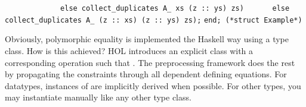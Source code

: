 \begin{isabellebody}
\begin{isamarkuptext}
\verb|             else collect_duplicates A_ xs (z :: ys) zs)|\newline%
\verb|      else collect_duplicates A_ (z :: xs) (z :: ys) zs);|\newline%
\newline%
\verb|end; (*struct Example*)|%
\end{isamarkuptext}%
\isamarkuptrue%
%
\endisatagquote
{\isafoldquote}%
%
\isadelimquote
%
\endisadelimquote
%
\begin{isamarkuptext}%
\noindent Obviously, polymorphic equality is implemented the Haskell
  way using a type class.  How is this achieved?  HOL introduces
  an explicit class  with a corresponding operation
   such that .
  The preprocessing framework does the rest by propagating the
   constraints through all dependent defining equations.
  For datatypes, instances of  are implicitly derived
  when possible.  For other types, you may instantiate 
  manually like any other type class.


\end{isamarkuptext}
\end{isabellebody}
